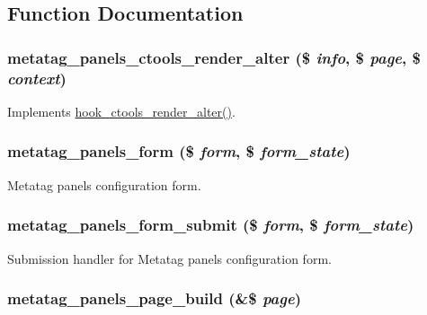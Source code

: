 \subsection{Function Documentation}
\hypertarget{metatag__panels_8module_a32cbb441f027447babe1a3a95999ebc8}{
\subsubsection[{metatag\_\-panels\_\-ctools\_\-render\_\-alter}]{\setlength{\rightskip}{0pt plus 5cm}metatag\_\-panels\_\-ctools\_\-render\_\-alter (\$ {\em info}, \/  \$ {\em page}, \/  \$ {\em context})}}
\label{metatag__panels_8module_a32cbb441f027447babe1a3a95999ebc8}
Implements \hyperlink{group__hooks_ga512e53c159fc6ea771d23b52d54b2f6a}{hook\_\-ctools\_\-render\_\-alter()}. \hypertarget{metatag__panels_8module_ab313cf7b1a9b2e97e584fb10cb7c4810}{
\subsubsection[{metatag\_\-panels\_\-form}]{\setlength{\rightskip}{0pt plus 5cm}metatag\_\-panels\_\-form (\$ {\em form}, \/  \$ {\em form\_\-state})}}
\label{metatag__panels_8module_ab313cf7b1a9b2e97e584fb10cb7c4810}
Metatag panels configuration form. \hypertarget{metatag__panels_8module_a9587bf5f8862c47d4da965c75d5cb0bf}{
\subsubsection[{metatag\_\-panels\_\-form\_\-submit}]{\setlength{\rightskip}{0pt plus 5cm}metatag\_\-panels\_\-form\_\-submit (\$ {\em form}, \/  \$ {\em form\_\-state})}}
\label{metatag__panels_8module_a9587bf5f8862c47d4da965c75d5cb0bf}
Submission handler for Metatag panels configuration form. \hypertarget{metatag__panels_8module_aedd357c1991b0fcabfbaeed6f37ab2fe}{
\subsubsection[{metatag\_\-panels\_\-page\_\-build}]{\setlength{\rightskip}{0pt plus 5cm}metatag\_\-panels\_\-page\_\-build (\&\$ {\em page})}}
